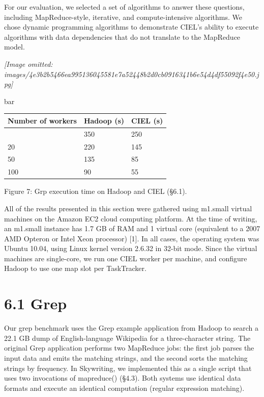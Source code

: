 \documentclass[
]{article}
\newcounter{none} %
\begin{document}
For our evaluation, we selected a set of algorithms to answer these
questions, including MapReduce-style, iterative, and compute-intensive
algorithms. We chose dynamic programming algorithms to demonstrate
CIEL's ability to execute algorithms with data dependencies that do not
translate to the MapReduce model.

\textit{[Image omitted: images/4e3b2b5466ea995136045581e7a52448b2d0cb0916341b6e54d4df55092f4e50.jpg]}

bar

{\def\LTcaptype{none} %
\begin{longtable}[]{@{}lll@{}}
\toprule\noalign{}
Number of workers & Hadoop (s) & CIEL (s) \\
\midrule\noalign{}
\endhead
\bottomrule\noalign{}
\endlastfoot
10 & 350 & 250 \\
20 & 220 & 145 \\
50 & 135 & 85 \\
100 & 90 & 55 \\
\end{longtable}
}

Figure 7: Grp execution time on Hadoop and CIEL (§6.1).

All of the results presented in this section were gathered using
m1.small virtual machines on the Amazon EC2 cloud computing platform. At
the time of writing, an m1.small instance has 1.7 GB of RAM and 1
virtual core (equivalent to a 2007 AMD Opteron or Intel Xeon processor)
{[}1{]}. In all cases, the operating system was Ubuntu 10.04, using
Linux kernel version 2.6.32 in 32-bit mode. Since the virtual machines
are single-core, we run one CIEL worker per machine, and configure
Hadoop to use one map slot per TaskTracker.

\section{6.1 Grep}\label{grep}

Our grep benchmark uses the Grep example application from Hadoop to
search a 22.1 GB dump of English-language Wikipedia for a
three-character string. The original Grep application performs two
MapReduce jobs: the first job parses the input data and emits the
matching strings, and the second sorts the matching strings by
frequency. In Skywriting, we implemented this as a single script that
uses two invocations of mapreduce() (§4.3). Both systems use identical
data formats and execute an identical computation (regular expression
matching).
\end{document}
